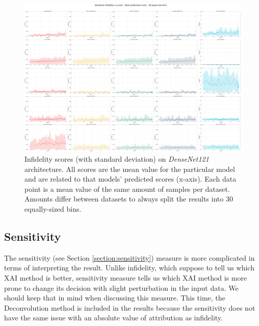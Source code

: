 \begin{figure}[ht]
  \centering
    \includegraphics[width=\textwidth]{results/metrics/densenet-infidelity vs score - false predictions only - 30 equal size bins.png}
    \caption{Infidelity scores (with standard deviation) on \textit{DenseNet121} architecture. All scores are the mean value for the particular model and are related to that models' predicted scores (x-axis). Each data point is a mean value of the same amount of samples per dataset. Amounts differ between datasets to always split the results into 30 equally-sized bins.}\label{fig:densenet-inf-std}
\end{figure}


\FloatBarrier

\subsection{Sensitivity}\label{results:sensitivity}

The sensitivity (see Section \ref{section:sensitivity}) measure is more complicated in terms of interpreting the result. Unlike infidelity, which suppose to tell us which XAI method is better, sensitivity measure tells us which XAI method is more prone to change its decision with slight perturbation in the input data. We should keep that in mind when discussing this measure. This time, the Deconvolution method is included in the results because the sensitivity does not have the same issue with an absolute value of attribution as infidelity.

